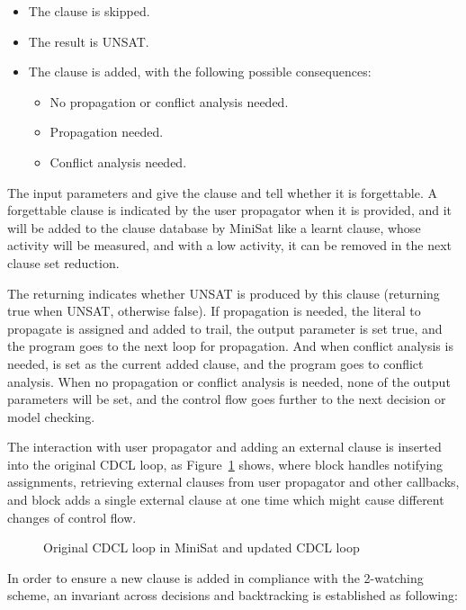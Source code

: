 \begin{itemize}
  \item The clause is skipped.
  \item The result is UNSAT.
  \item The clause is added, with the following possible consequences:
    \begin{itemize}
      \item No propagation or conflict analysis needed.
      \item Propagation needed.
      \item Conflict analysis needed.
    \end{itemize}
\end{itemize}

The input parameters  and  give the clause and tell whether it is forgettable. A forgettable clause is indicated by the user propagator when it is provided, and it will be added to the clause database by MiniSat like a learnt clause, whose activity will be measured, and with a low activity, it can be removed in the next clause set reduction.

The returning  indicates whether UNSAT is produced by this clause (returning true when UNSAT, otherwise false). If propagation is needed, the literal to propagate is assigned and added to trail, the output parameter  is set true, and the program goes to the next loop for propagation. And when conflict analysis is needed,  is set as the current added clause, and the program goes to conflict analysis. When no propagation or conflict analysis is needed, none of the output parameters will be set, and the control flow goes further to the next decision or model checking.

The interaction with user propagator and adding an external clause is inserted into the original CDCL loop, as Figure~\ref{fig:flow} shows, where  block handles notifying assignments, retrieving external clauses from user propagator and other callbacks, and  block adds a single external clause at one time which might cause different changes of control flow.

\begin{figure}[!htbp]
  \centering
  
  \caption{Original CDCL loop in MiniSat and updated CDCL loop}
  \label{fig:flow}
\end{figure}

In order to ensure a new clause is added in compliance with the 2-watching scheme, an invariant across decisions and backtracking is established as following:

